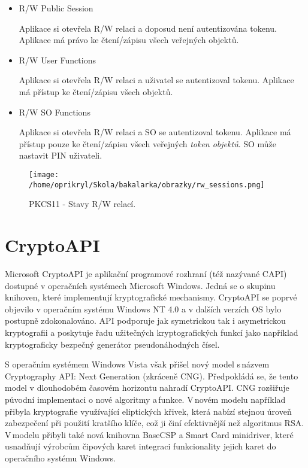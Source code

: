 \documentclass[]{fithesis3}
\begin{document}
		\begin{itemize}
			\item R/W Public Session

			Aplikace si otevřela R/W relaci a doposud není autentizována tokenu. Aplikace má 				právo ke čtení/zápisu všech veřejných objektů.
	
			\item R/W User Functions

			Aplikace si otevřela R/W relaci a uživatel se autentizoval tokenu. Aplikace má přístup 			ke čtení/zápisu všech objektů.

			\item R/W SO Functions

			Aplikace si otevřela R/W relaci a SO se autentizoval tokenu. Aplikace má přístup 					pouze ke čtení/zápisu všech veřejných \textit{token objektů}. SO může nastavit PIN 				uživateli.
		\end{itemize}

		\begin{figure}[!ht]
  			\begin{minipage}{1.00\textwidth}
    				\texttt{[image: /home/oprikryl/Skola/bakalarka/obrazky/rw\_sessions.png]}
  			\end{minipage}
 			\caption{PKCS11 - Stavy R/W relací.}
  			\label{fig:PKCS11 - Stavy R/W relací.}
		\end{figure}	
		
\chapter{CryptoAPI}

Microsoft CryptoAPI je aplikační programové rozhraní (též nazývané CAPI) dostupné v operačních systémech Microsoft Windows. Jedná se o skupinu knihoven, které implementují kryptografické mechanismy. CryptoAPI se poprvé objevilo v operačním systému Windows NT 4.0 a v dalších verzích OS bylo postupně zdokonalováno. API podporuje jak symetrickou tak i asymetrickou kryptografii a poskytuje řadu užitečných kryptografických funkcí jako například kryptograficky bezpečný generátor pseudonáhodných čísel. 

S operačním systémem Windows Vista však přišel nový model s\,názvem Cryptography API: Next Generation (zkráceně CNG). Předpokládá se, že tento model v dlouhodobém časovém horizontu nahradí CryptoAPI. CNG rozšiřuje původní implementaci o nové algoritmy a\,funkce. V\,novém modelu například přibyla kryptografie využívající eliptických křivek, která nabízí stejnou úroveň zabezpečení při použití kratšího klíče, což ji činí efektivnější než algoritmus RSA. V\,modelu přibyli také nová knihovna BaseCSP a Smart Card minidriver, které usnadňují výrobcům čipových karet integraci funkcionality jejich karet do operačního systému Windows.
\end{document}

